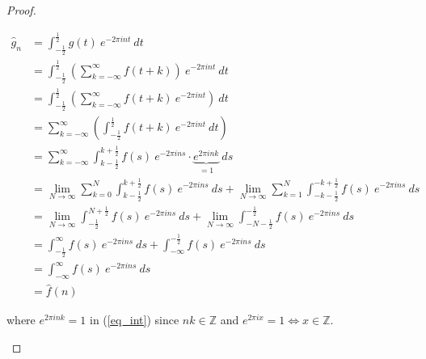 \documentclass[12pt, reqno]{article}
\theoremstyle{definition}
\theoremstyle{remark}
\begin{document}
\begin{itemize}
\begin{proof}
\begin{enumerate}
        \begin{align}
        \hat g_{n}&= \int_{- \frac{1}{2}}^{\frac{1}{2}}g(t)~e^{-2\pi int}\ dt\\
        &= \int_{- \frac{1}{2}}^{\frac{1}{2}}\left(\sum_{k=-\infty}^{\infty}f(t+k)\right)~e^{-2\pi int}\ dt\\
        &= \int_{- \frac{1}{2}}^{\frac{1}{2}}\left(\sum_{k=-\infty}^{\infty}f(t+k)~e^{-2\pi int}\right)\ dt\\
        &= \sum_{k=-\infty}^{\infty}\left(\int_{- \frac{1}{2}}^{\frac{1}{2}}f(t+k)~e^{-2\pi int}\ dt\right) \label{eq_order_switch}
        \\
        &= \sum_{k=-\infty}^{\infty}\int_{k- \frac{1}{2}}^{k+\frac{1}{2}}f(s)~e^{-2\pi ins}\cdot \underbrace{e^{2\pi ink}}_{=1}\ ds \label{eq_int}
        \\
        &= \lim_{N \rightarrow \infty}\sum_{k=0}^{N}\int_{k- \frac{1}{2}}^{k + \frac{1}{2}}f(s)~e^{-2\pi ins}\ ds+\lim_{N \rightarrow \infty}\sum_{k=1}^{N}\int_{-k- \frac{1}{2}}^{-k + \frac{1}{2}}f(s)~e^{-2\pi ins}\ ds\\
        &= \lim_{N \rightarrow \infty}\int_{-\frac{1}{2}}^{N + \frac{1}{2}}f(s)~e^{-2\pi ins}\ ds+\lim_{N \rightarrow \infty}\int_{-N- \frac{1}{2}}^{-\frac{1}{2}}f(s)~e^{-2\pi ins}\ ds\\
        &= \int_{- \frac{1}{2}}^{\infty}f(s)~e^{-2\pi ins}\ ds+\int_{-\infty}^{- \frac{1}{2}}f(s)~e^{-2\pi ins}\ ds\\
        &= \int_{-\infty}^{\infty}f(s)~e^{-2\pi ins}\ ds\\
        &= \widehat f(n)
        \end{align}
        
        where $e^{2\pi ink}=1$ in (\ref{eq_int}) since $nk\in \mathbb{Z}$ and $e^{2\pi i x}=1\iff x\in\mathbb{Z}$.  
    \end{enumerate}
\end{proof}





\end{itemize}
\end{document}

